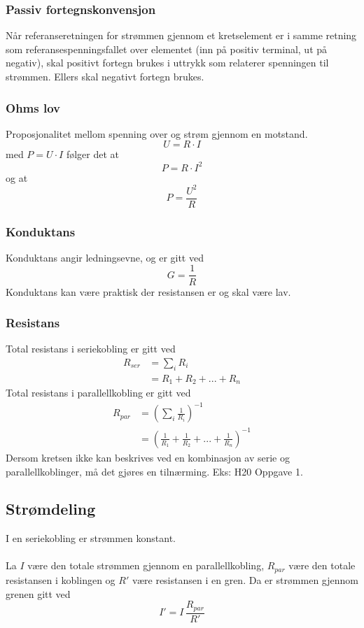 \documentclass{article}
\begin{document}
\subsubsection{Passiv fortegnskonvensjon}
Når referanseretningen for strømmen gjennom et kretselement er i samme retning
som referansespenningsfallet over elementet (inn på positiv terminal, ut på negativ), skal positivt fortegn brukes i uttrykk som relaterer spenningen til strømmen. Ellers skal negativt fortegn brukes.

\subsubsection{Ohms lov}
Proposjonalitet mellom spenning over og strøm gjennom en motstand.
\[U = R \cdot I\]
med $P = U \cdot I$ følger det at
\[P = R \cdot I^2\]
og at
\[P = \frac{U^2}{R}\]


\subsubsection{Konduktans}
Konduktans angir ledningsevne, og er gitt ved
\[G = \frac{1}{R}\]
Konduktans kan være praktisk der resistansen er og skal være lav.


\subsubsection{Resistans}
Total resistans i seriekobling er gitt ved
\begin{align*}
    R_{ser} &= \sum_i R_i \\
    &= R_1 + R_2 + ... + R_n
\end{align*}
Total resistans i parallellkobling er gitt ved
\begin{align*}
    R_{par} &= \left( \sum_i \frac{1}{R_i} \right)^{-1} \\
    &= \left(\frac{1}{R_1} + \frac{1}{R_2} + ... + \frac{1}{R_n}\right)^{-1}
\end{align*}
Dersom kretsen ikke kan beskrives ved en kombinasjon av serie og parallellkoblinger, må det gjøres en tilnærming. Eks: H20 Oppgave 1.


\subsection{Strømdeling}
I en seriekobling er strømmen konstant.\\\\
La $I$ være den totale strømmen gjennom en parallellkobling, $R_{par}$ være den totale resistansen i koblingen og $R'$ være resistansen i en gren. Da er strømmen gjennom grenen gitt ved
\[I' = I \, \frac{R_{par}}{R'}\]
\end{document}
